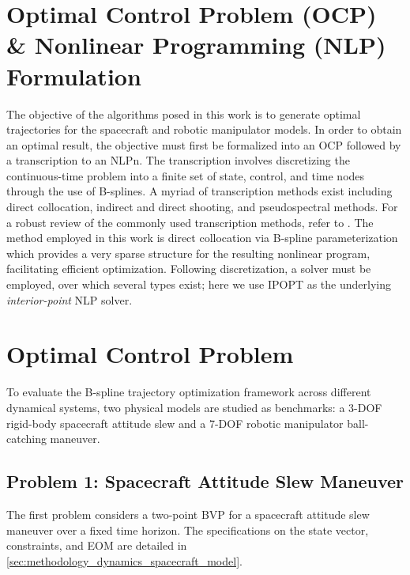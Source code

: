 \section{Optimal Control Problem (OCP) \& Nonlinear Programming (NLP) Formulation}
The objective of the algorithms posed in this work is to generate optimal trajectories for the spacecraft and robotic manipulator models. 
In order to obtain an optimal result, the objective must first be formalized into an \ac{OCP} followed by a transcription to an \ac{NLPn}.
The transcription involves discretizing the continuous-time problem into a finite set of state, control, and time nodes through the use of B-splines.
A myriad of transcription methods exist including direct collocation, indirect and direct shooting, and pseudospectral methods. 
For a robust review of the commonly used transcription methods, refer to \cite{Rao09, Betts10}.
The method employed in this work is direct collocation via B-spline parameterization which provides a very sparse structure for the resulting nonlinear program, facilitating efficient optimization.
Following discretization, a solver must be employed, over which several types exist; here we use \ac{IPOPT} as the underlying \emph{interior-point} NLP solver.

\section{Optimal Control Problem}
\label{sec:ocp}

To evaluate the B-spline trajectory optimization framework across different dynamical systems, two physical models are studied as benchmarks: 
a 3-\ac{DOF} rigid-body spacecraft attitude slew and a 7-\ac{DOF} robotic manipulator ball-catching maneuver.

\subsection{Problem 1: Spacecraft Attitude Slew Maneuver}
\label{sec:ocp_spacecraft}

The first problem considers a two-point \ac{BVP} for a spacecraft attitude slew maneuver over a fixed time horizon.
The specifications on the state vector, constraints, and \ac{EOM} are detailed in \cref{sec:methodology_dynamics_spacecraft_model}.

